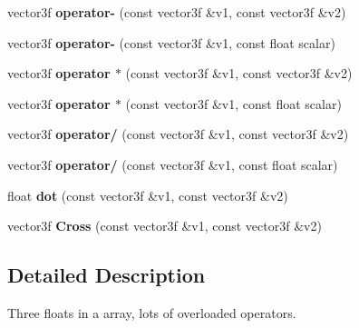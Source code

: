 \begin{CompactItemize}
\item 
{}
vector3f {\bf operator-} (const vector3f \&v1, const vector3f \&v2)\label{classvector3f_l7}

\item 
{}
vector3f {\bf operator-} (const vector3f \&v1, const float scalar)\label{classvector3f_l8}

\item 
{}
vector3f {\bf operator $\ast$} (const vector3f \&v1, const vector3f \&v2)\label{classvector3f_l9}

\item 
{}
vector3f {\bf operator $\ast$} (const vector3f \&v1, const float scalar)\label{classvector3f_l10}

\item 
{}
vector3f {\bf operator/} (const vector3f \&v1, const vector3f \&v2)\label{classvector3f_l11}

\item 
{}
vector3f {\bf operator/} (const vector3f \&v1, const float scalar)\label{classvector3f_l12}

\item 
{}
float {\bf dot} (const vector3f \&v1, const vector3f \&v2)\label{classvector3f_l13}

\item 
{}
vector3f {\bf Cross} (const vector3f \&v1, const vector3f \&v2)\label{classvector3f_l14}

\end{CompactItemize}


\subsection{Detailed Description}
Three floats in a array, lots of overloaded operators.

